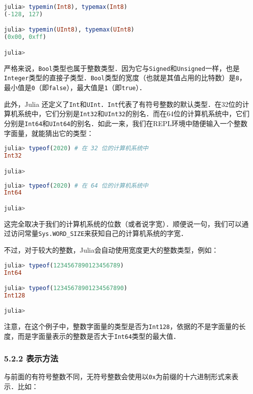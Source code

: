 \begin{lstlisting}[language=julia]
julia> typemin(Int8), typemax(Int8)
(-128, 127)

julia> typemin(UInt8), typemax(UInt8)
(0x00, 0xff)

julia> 
\end{lstlisting}

严格来说，\verb|Bool|类型也属于整数类型．因为它与\verb|Signed|和\verb|Unsigned|一样，也是\verb|Integer|类型的直接子类型．\verb|Bool|类型的宽度（也就是其值占用的比特数）是\verb|8|，最小值是\verb|0|（即\verb|false|），最大值是\verb|1|（即\verb|true|）．

此外，Julia 还定义了\verb|Int|和\verb|UInt|．\verb|Int|代表了有符号整数的默认类型．在32位的计算机系统中，它们分别是\verb|Int32|和\verb|UInt32|的别名．而在64位的计算机系统中，它们分别是\verb|Int64|和\verb|UInt64|的别名．如此一来，我们在REPL环境中随便输入一个整数字面量，就能猜出它的类型：

\begin{lstlisting}[language=julia]
julia> typeof(2020) # 在 32 位的计算机系统中 
Int32 

julia> 
\end{lstlisting}

\begin{lstlisting}[language=julia]
julia> typeof(2020) # 在 64 位的计算机系统中 
Int64

julia> 
\end{lstlisting}

这完全取决于我们的计算机系统的位数（或者说字宽）．顺便说一句，我们可以通过访问常量\verb|Sys.WORD_SIZE|来获知自己的计算机系统的字宽．

不过，对于较大的整数，Julia会自动使用宽度更大的整数类型，例如：

\begin{lstlisting}[language=julia]
julia> typeof(1234567890123456789)
Int64

julia> typeof(12345678901234567890)
Int128

julia> 
\end{lstlisting}

注意，在这个例子中，整数字面量的类型是否为\verb|Int128|，依据的不是字面量的长度，而是字面量表示的整数是否大于\verb|Int64|类型的最大值．

\subsubsection{5.2.2 表示方法}

与前面的有符号整数不同，无符号整数会使用以\verb|0x|为前缀的十六进制形式来表示．比如：


